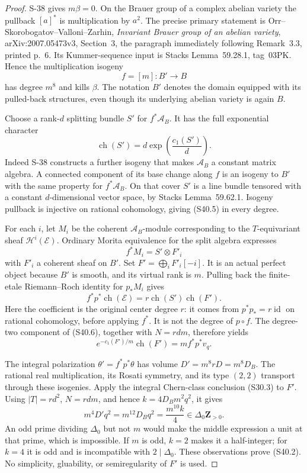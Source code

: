 \begin{proof}
S-38 gives $m\beta=0$. On the Brauer group of a complex abelian
variety the pullback $[a]^*$ is multiplication by $a^2$.
The precise primary statement is Orr--Skorobogatov--Valloni--Zarhin,
\emph{Invariant Brauer group of an abelian variety},
arXiv:2007.05473v3, Section~3, the paragraph immediately following
Remark~3.3, printed p.~6. Its Kummer-sequence input is Stacks
Lemma~59.28.1, tag~03PK. Hence the multiplication isogeny
\[
 f=[m]:B'\longrightarrow B
 \tag{S40.4}
\]
has degree $m^8$ and kills $\beta$. The notation $B'$ denotes the
domain equipped with its pulled-back structures, even though its
underlying abelian variety is again $B$.

Choose a rank-$d$ splitting bundle $S'$ for
$f^*\mathscr A_B$. It has the full exponential character
\[
 \operatorname{ch}(S')=d\exp\!\left(\frac{c_1(S')}{d}\right).
 \tag{S40.5}
\]
Indeed S-38 constructs a further isogeny that makes $\mathscr A_B$
a constant matrix algebra. A connected component of its base
change along $f$ is an isogeny to $B'$ with the same property for
$f^*\mathscr A_B$. On that cover $S'$ is a line bundle tensored
with a constant $d$-dimensional vector space, by Stacks
Lemma~59.62.1. Isogeny pullback is injective on rational
cohomology, giving (S40.5) in every degree.

For each $i$, let $M_i$ be the coherent $\mathscr A_B$-module
corresponding to the $T$-equivariant sheaf
$\mathcal H^i(\mathcal E)$. Ordinary Morita equivalence for the
split algebra expresses
\[
 f^*M_i=S'\otimes F'_i
\]
with $F'_i$ a coherent sheaf on $B'$. Set
$F'=\bigoplus_i F'_i[-i]$. It is an actual perfect object because
$B'$ is smooth, and its virtual rank is $m$. Pulling back the
finite-etale Riemann--Roch identity for $p_*M_i$ gives
\[
 f^*p^*\operatorname{ch}(\mathcal E)
   =r\operatorname{ch}(S')\operatorname{ch}(F').
 \tag{S40.6}
\]
Here the coefficient is the original center degree $r$:
it comes from $p^*p_*=r\operatorname{id}$ on rational cohomology,
before applying $f^*$. It is not the degree of $p\circ f$.
The degree-two component of (S40.6), together with $N=rdm$,
therefore yields
\[
 e^{-c_1(F')/m}\operatorname{ch}(F')
    =m f^*p^*v_q.
 \tag{S40.7}
\]

The integral polarization $\theta'=f^*p^*\theta$ has volume
$D'=m^8rD=m^8D_B$. The rational real multiplication, its Rosati
symmetry, and its type $(2,2)$ transport through these isogenies.
Apply the integral Chern-class conclusion (S30.3) to $F'$.
Using $|T|=rd^2$, $N=rdm$, and hence
$k=4D_Bm^2q^2$, it gives
\[
 m^4D'q^2
   =m^{12}D_Bq^2
   =\frac{m^{10}k}{4}
   \in\Delta_0\mathbf Z_{>0}.
 \tag{S40.8}
\]
An odd prime dividing $\Delta_0$ but not $m$ would make the
middle expression a unit at that prime, which is impossible.
If $m$ is odd, $k=2$ makes it a half-integer; for $k=4$ it is
odd and is incompatible with $2\mid\Delta_0$. These observations
prove (S40.2). No simplicity, gluability, or semiregularity of
$F'$ is used.


\end{proof}
